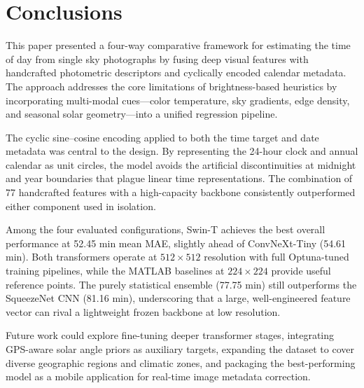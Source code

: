 \documentclass[9pt, a4paper, twocolumn]{article}
\begin{document}
\section{Conclusions}

This paper presented a four-way comparative framework for estimating the time of day from single sky photographs by fusing deep visual features with handcrafted photometric descriptors and cyclically encoded calendar metadata. The approach addresses the core limitations of brightness-based heuristics by incorporating multi-modal cues---color temperature, sky gradients, edge density, and seasonal solar geometry---into a unified regression pipeline.

The cyclic sine--cosine encoding applied to both the time target and date metadata was central to the design. By representing the 24-hour clock and annual calendar as unit circles, the model avoids the artificial discontinuities at midnight and year boundaries that plague linear time representations. The combination of 77 handcrafted features with a high-capacity backbone consistently outperformed either component used in isolation.

Among the four evaluated configurations, Swin-T achieves the best overall performance at 52.45 min mean MAE, slightly ahead of ConvNeXt-Tiny (54.61 min). Both transformers operate at $512\times512$ resolution with full Optuna-tuned training pipelines, while the MATLAB baselines at $224\times224$ provide useful reference points. The purely statistical ensemble (77.75 min) still outperforms the SqueezeNet CNN (81.16 min), underscoring that a large, well-engineered feature vector can rival a lightweight frozen backbone at low resolution.

Future work could explore fine-tuning deeper transformer stages, integrating GPS-aware solar angle priors as auxiliary targets, expanding the dataset to cover diverse geographic regions and climatic zones, and packaging the best-performing model as a mobile application for real-time image metadata correction.

\end{document}
